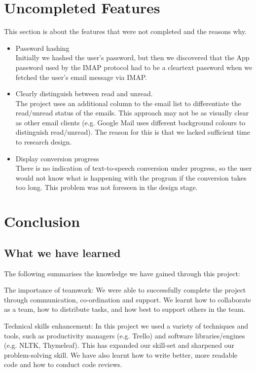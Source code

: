 \documentclass{article}
\begin{document}
\section{Uncompleted Features}
This section is about the features that were not completed and the reasons why.
\begin{itemize}
    \item Password hashing \\ 
    Initially we hashed the user's password, but then we discovered that the App password used by the IMAP protocol had to be a cleartext password when we fetched the user's email message via IMAP.
    \item Clearly distinguish between read and unread. \\ 
    The project uses an additional column to the email list to differentiate the read/unread status of the emails. This approach may not be as visually clear as other email clients (e.g. Google Mail uses different background colours to distinguish read/unread). The reason for this is that we lacked sufficient time to research design.
    \item  Display conversion progress \\ 
    There is no indication of text-to-speech conversion under progress, so the user would not know what is happening with the program if the conversion takes too long. This problem was not foreseen in the design stage.

\end{itemize}


\section{Conclusion}
\subsection{What we have learned}

The following summarises the knowledge we have gained through this project:

The importance of teamwork: We were able to successfully complete the project through communication, co-ordination and support. We learnt how to collaborate as a team, how to distribute tasks, and how best to support others in the team.

Technical skills enhancement: In this project we used a variety of techniques and tools, such as productivity managers (e.g. Trello) and software libraries/engines (e.g. NLTK, Thymeleaf). This has expanded our skill-set and sharpened our problem-solving skill. We have also learnt how to write better, more readable code and how to conduct code reviews.
\end{document}
